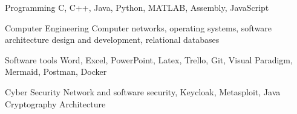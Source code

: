 

\begin{cvskills}

  \cvskill
    {Programming} %
    {C, C++, Java, Python, MATLAB, Assembly, JavaScript} %

  \cvskill
    {Computer Engineering}
    {Computer networks, operating systems, software architecture design and development, relational databases}

  \cvskill
    {Software tools}
    {Word, Excel, PowerPoint, Latex, Trello, Git, Visual Paradigm, Mermaid, Postman, Docker}

  \cvskill
    {Cyber Security}
    {Network and software security, Keycloak, Metasploit, Java Cryptography Architecture}

\end{cvskills}
